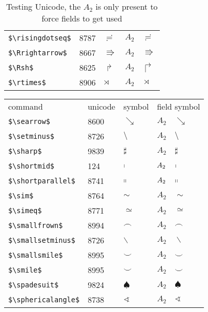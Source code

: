 \documentclass{article}
\begin{document}
\begin{table}
\begin{center}
\begin{tabular}{llll}
 \verb#$\risingdotseq$#       & 8787 & $\risingdotseq$       & $A_2\quad \risingdotseq$\\
 \verb#$\Rrightarrow$#        & 8667 & $\Rrightarrow$        & $A_2\quad \Rrightarrow$\\
 \verb#$\Rsh$#                & 8625 & $\Rsh$                & $A_2\quad \Rsh$\\
 \verb#$\rtimes$#             & 8906 & $\rtimes$             & $A_2\quad \rtimes$\\
\end{tabular}
\end{center}
\caption{Testing Unicode, the $A_2$ is only present to force fields to get used}
\end{table}

\begin{table}
\begin{center}
\begin{tabular}{llll}
 command                    &unicode & symbol                & field symbol\\
 \verb#$\searrow$#            & 8600 & $\searrow$            & $A_2\quad \searrow$\\
 \verb#$\setminus$#           & 8726 & $\setminus$           & $A_2\quad \setminus$\\
 \verb#$\sharp$#              & 9839 & $\sharp$              & $A_2\quad \sharp$\\
 \verb#$\shortmid$#            & 124 & $\shortmid$           & $A_2\quad \shortmid$\\
 \verb#$\shortparallel$#      & 8741 & $\shortparallel$      & $A_2\quad \shortparallel$\\
 \verb#$\sim$#                & 8764 & $\sim$                & $A_2\quad \sim$\\
 \verb#$\simeq$#              & 8771 & $\simeq$              & $A_2\quad \simeq$\\
 \verb#$\smallfrown$#         & 8994 & $\smallfrown$         & $A_2\quad \smallfrown$\\
 \verb#$\smallsetminus$#      & 8726 & $\smallsetminus$      & $A_2\quad \smallsetminus$\\
 \verb#$\smallsmile$#         & 8995 & $\smallsmile$         & $A_2\quad \smallsmile$\\
 \verb#$\smile$#              & 8995 & $\smile$              & $A_2\quad \smile$\\
 \verb#$\spadesuit$#          & 9824 & $\spadesuit$          & $A_2\quad \spadesuit$\\
 \verb#$\sphericalangle$#     & 8738 & $\sphericalangle$     & $A_2\quad \sphericalangle$\\

\end{tabular}
\end{center}
\end{table}
\end{document}
